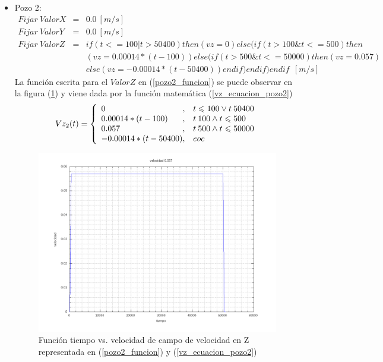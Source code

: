 \documentclass[10pt,a4paper,final]{article}
\begin{document}
\begin{itemize}
\item Pozo 2:
\begin{eqnarray} \label{pozo2_funcion}
\nonumber
Fijar~ValorX&=&0.0~[m/s]\\
\nonumber
Fijar~ValorY&=&0.0~[m/s]\\
Fijar~ValorZ&=& if(t<=100|t>50400)then(vz=0)else(if(t>100\& t<=500)then\\
\nonumber
&&(vz=0.00014*(t-100))else(if(t>500\& t<=50000)then(vz=0.057)\\&&
\nonumber
else(vz=-0.00014*(t-50400))endif)endif)endif~~[m/s]
\end{eqnarray}
La función escrita para el $ValorZ$ en (\ref{pozo2_funcion}) se puede observar en la figura (\ref{grafica1_0057})  y viene dada por la función matemática (\ref{vz_ecuacion_pozo2})
%
\begin{equation}\label{vz_ecuacion_pozo2}
Vz_2(t) = \left\{
\begin{array}{l@{,\quad}l}
0 & t \leqslant 100 \vee t \> 50400 \\
0.00014*(t-100) & t \> 100 \wedge t \leqslant 500 \\
0.057 & t \> 500 \wedge t \leqslant 50000 \\
-0.00014*(t-50400) & eoc
\end{array}
\right.
\end{equation}
%

\begin{figure}[tbhp]
\centerline{\includegraphics[scale=0.3]{graficas/grafica1_0057}}
\caption{Función tiempo vs. velocidad de campo de velocidad en Z representada en (\ref{pozo2_funcion}) y (\ref{vz_ecuacion_pozo2})}
\label{grafica1_0057}
\end{figure}

\end{itemize}
\end{document}
